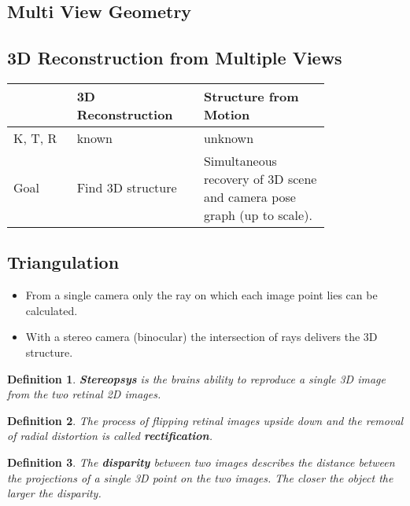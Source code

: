\documentclass[10pt,a4paper]{scrartcl}
\newtheorem{define}{Definition}
\begin{document}
\begin{multicols*}{2}
\section{Multi View Geometry}

\subsection{3D Reconstruction from Multiple Views}

\begin{center}
\begin{tabular}{l|p{0.4\linewidth}|p{0.4\linewidth}}
&3D Reconstruction &Structure from Motion\\\midrule
K, T, R&known&unknown\\\midrule
Goal&Find 3D structure&Simultaneous recovery of 3D scene and camera pose graph (up to scale).
\end{tabular}
\end{center}

\subsection{Triangulation}

\begin{itemize}
\item From a single camera only the ray on which each image point lies can be calculated.
\item With a stereo camera (binocular) the intersection of rays delivers the 3D structure.
\end{itemize}

\begin{define}
\textbf{Stereopsys} is the brains ability to reproduce a single 3D image from the two retinal 2D images.
\end{define}

\begin{define}
The process of flipping retinal images upside down and the removal of radial distortion is called \textbf{rectification}.
\end{define}

\begin{define}
The \textbf{disparity} between two images describes the distance between the projections of a single 3D point on the two images. The closer the object the larger the disparity.
\end{define}


\end{multicols*}
\end{document}
